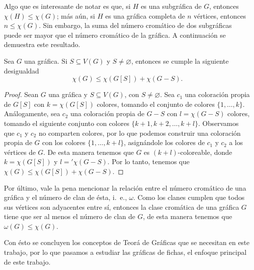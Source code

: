 Algo que es interesante de notar es que, si $H$ es una subgr\'afica de $G$,
entonces $\chi(H) \leq \chi(G)$; m\'as a\'un, si $H$ es una gr\'afica completa
de $n$ v\'ertices, entonces $n \leq \chi(G)$. Sin embargo, la suma del n\'umero
crom\'atico de dos subgr\'aficas puede ser mayor que el n\'umero crom\'atico de
la gr\'afica. A continuaci\'on se demuestra este resultado.

\begin{proposicion}
    Sea $G$ una gr\'afica.   Si $S \subseteq V(G)$ y $S \neq \varnothing$,
    entonces se cumple la siguiente desigualdad
    \[
        \chi(G) \leq \chi(G[S])+\chi(G-S).
    \] 
\end{proposicion}

\begin{proof}
    Sean $G$ una gr\'afica y $S \subseteq V(G)$, con $S \neq \varnothing$.  Sea
    $c_1$ una coloraci\'on propia de $G[S]$ con $ k= \chi(G[S])$ colores,
    tomando el conjunto de colores $\{1, \dots, k\}$. An\'alogamente, sea $c_2$
    una coloraci\'on propia de $G-S$ con $l= \chi(G-S)$ colores, tomando el
    siguiente conjunto con colores $\{k+1, k+2, \dots, k+l\}$. Observamos que
    $c_1$ y $c_2$ no comparten colores, por lo que podemos construir una
    coloraci\'on propia de $G$ con los colores $\{1, \dots, k+l\}$,
    asign\'andole los colores de $c_1$ y $c_2$ a los v\'ertices de $G$. De esta
    manera tenemos que $G$ es $(k+l)$-coloreable, donde $k = \chi(G[S])$ y $l =
    '\chi(G-S)$. Por lo tanto, tenemos que $\chi(G) \leq \chi(G[S])+\chi(G-S)$.
\end{proof}

Por \'ultimo, vale la pena mencionar la relaci\'on entre el n\'umero crom\'atico
de una gr\'afica y el n\'umero de clan de \'esta, i.~e., $\omega$. Como los
clanes cumplen que todos sus v\'ertices son adyacentes entre s\'i, entonces la
clase crom\'atica de una gr\'afica $G$ tiene que ser al menos el n\'umero de
clan de $G$, de esta manera tenemos que $\omega(G) \leq \chi(G)$. 

Con \'esto se concluyen los conceptos de Teor\'a de Gr\'aficas que se necesitan
en este trabajo, por lo que pasamos a estudiar las gr\'aficas de fichas, el
enfoque principal de este trabajo.
